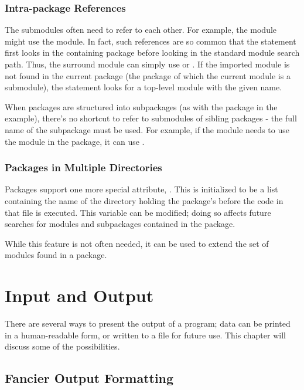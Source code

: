 \documentclass{manual}
\begin{document}
\subsection{Intra-package References}

The submodules often need to refer to each other.  For example, the
 module might use the  module.  In fact,
such references
are so common that the  statement first looks in the
containing package before looking in the standard module search path.
Thus, the surround module can simply use  or
.  If the imported module is not
found in the current package (the package of which the current module
is a submodule), the  statement looks for a top-level
module with the given name.

When packages are structured into subpackages (as with the
 package in the example), there's no shortcut to refer
to submodules of sibling packages - the full name of the subpackage
must be used.  For example, if the module
 needs to use the  module
in the  package, it can use .

\subsection{Packages in Multiple Directories}

Packages support one more special attribute, .  This
is initialized to be a list containing the name of the directory
holding the package's  before the code in that file
is executed.  This variable can be modified; doing so affects future
searches for modules and subpackages contained in the package.

While this feature is not often needed, it can be used to extend the
set of modules found in a package.



\chapter{Input and Output \label{io}}

There are several ways to present the output of a program; data can be
printed in a human-readable form, or written to a file for future use.
This chapter will discuss some of the possibilities.


\section{Fancier Output Formatting \label{formatting}}
\end{document}
